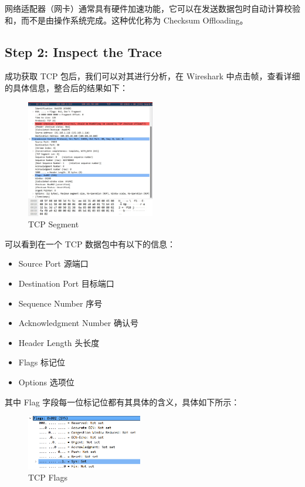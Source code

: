 \documentclass[14pt,a4paper,UTF8,twoside]{article}
\begin{document}
网络适配器（网卡）通常具有硬件加速功能，它可以在发送数据包时自动计算校验和，而不是由操作系统完成。这种优化称为 Checksum Offloading。

\subsection{Step 2: Inspect the Trace}

成功获取 TCP 包后，我们可以对其进行分析，在 Wireshark 中点击帧，查看详细的具体信息，整合后的结果如下：

\begin{figure}[H]
	\centering
	\includegraphics[width=0.5\textwidth]{lab6/combina.jpg}
	\caption{TCP Segment}
\end{figure}

可以看到在一个 TCP 数据包中有以下的信息：

\begin{itemize}
	\item Source Port 源端口
	\item Destination Port 目标端口
	\item Sequence Number 序号
	\item Acknowledgment Number 确认号
	\item Header Length 头长度
	\item Flags 标记位
	\item Options 选项位
\end{itemize}

其中 Flag 字段每一位标记位都有其具体的含义，具体如下所示：

\begin{figure}[H]
	\centering
	\includegraphics[width=0.45\textwidth]{lab6/flag.png}
	\caption{TCP Flags}
\end{figure}
\end{document}
